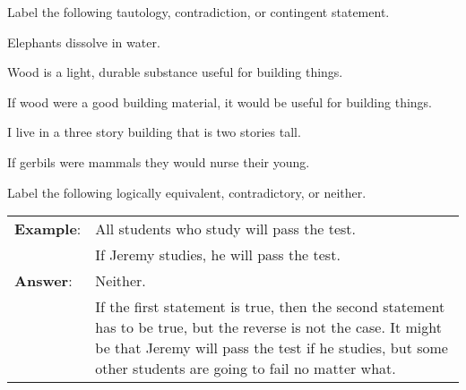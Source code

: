 \noindent \problempart Label the following tautology, contradiction, or contingent statement.
\begin{exercises}
\item Elephants dissolve in water. 
\item Wood is a light, durable substance useful for building things. 
\item If wood were a good building material, it would be useful for building things. 
\item I live in a three story building that is two stories tall. 
\item If gerbils were mammals they would nurse their young. 
\end{exercises}

\noindent \problempart Label the following logically equivalent, contradictory, or neither. 

\begin{longtabu}{p{.1\linewidth}p{.9\linewidth}}
\textbf{Example}: &  All students who study will pass the test. \\
& If Jeremy studies, he will pass the test. \\
\textbf{Answer}: & Neither. \\
&If the first statement is true, then the second statement has to be true, but the reverse is not the case. It might be that Jeremy will pass the test if he studies, but some other students are going to fail no matter what.\\
\end{longtabu}

